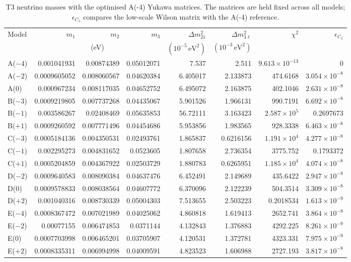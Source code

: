 \begin{table}[p]
\centering
\caption{T3 neutrino masses with the optimised A(-4) Yukawa matrices. The matrices are held fixed across all models; $\epsilon_{C_5}$ compares the low-scale Wilson matrix with the A(-4) reference.}
\label{tab:appC_Am4_masses}
\begingroup
\footnotesize
\setlength{\tabcolsep}{3.2pt}
\begin{tabular}{lrrrrrrr}
\hline
Model & $m_1$ & $m_2$ & $m_3$ & $\Delta m^2_{21}$ & $\Delta m^2_{3\ell}$ & $\chi^2$ & $\epsilon_{C_5}$ \\
 & \multicolumn{3}{c}{(eV)} & $(10^{-5}\,\mathrm{eV}^2)$ & $(10^{-3}\,\mathrm{eV}^2)$ &  &  \\
\hline
A($-4$) & 0.001041931 & 0.00874389 & 0.05012071 & 7.537 & 2.511 & $9.613\times10^{-13}$ & 0 \\
A($-2$) & 0.0009605052 & 0.008060567 & 0.04620384 & 6.405017 & 2.133873 & 474.6168 & $3.054\times10^{-8}$ \\
A($0$) & 0.000967234 & 0.008117035 & 0.04652752 & 6.495072 & 2.163875 & 402.1046 & $2.631\times10^{-8}$ \\
B($-3$) & 0.0009219805 & 0.007737268 & 0.04435067 & 5.901526 & 1.966131 & 990.7191 & $6.692\times10^{-8}$ \\
B($-1$) & 0.003586267 & 0.02408469 & 0.05635853 & 56.72111 & 3.163423 & $2.587\times10^{5}$ & 0.2697673 \\
B($+1$) & 0.0009260592 & 0.007771496 & 0.04454686 & 5.953856 & 1.983565 & 928.3338 & $6.463\times10^{-8}$ \\
C($-3$) & 0.0005184136 & 0.004350531 & 0.02493761 & 1.865837 & 0.6216156 & $1.191\times10^{4}$ & $4.277\times10^{-8}$ \\
C($-1$) & 0.002295273 & 0.004831652 & 0.0523605 & 1.807658 & 2.736354 & 3775.752 & 0.1793372 \\
C($+1$) & 0.0005204859 & 0.004367922 & 0.02503729 & 1.880783 & 0.6265951 & $1.185\times10^{4}$ & $4.074\times10^{-8}$ \\
D($-2$) & 0.0009640583 & 0.008090384 & 0.04637476 & 6.452491 & 2.149689 & 435.6422 & $2.947\times10^{-8}$ \\
D($0$) & 0.0009578833 & 0.008038564 & 0.04607772 & 6.370096 & 2.122239 & 504.3514 & $3.309\times10^{-8}$ \\
D($+2$) & 0.001040316 & 0.008730339 & 0.05004303 & 7.513655 & 2.503223 & 0.2018534 & $1.613\times10^{-9}$ \\
E($-4$) & 0.0008367472 & 0.007021989 & 0.04025062 & 4.860818 & 1.619413 & 2652.741 & $3.864\times10^{-8}$ \\
E($-2$) & 0.00077155 & 0.006474853 & 0.0371144 & 4.132843 & 1.376883 & 4292.225 & $8.261\times10^{-9}$ \\
E($0$) & 0.0007703998 & 0.006465201 & 0.03705907 & 4.120531 & 1.372781 & 4323.331 & $7.975\times10^{-9}$ \\
E($+2$) & 0.0008335311 & 0.006994998 & 0.04009591 & 4.823523 & 1.606988 & 2727.193 & $3.817\times10^{-8}$ \\
\hline
\end{tabular}
\endgroup
\end{table}
